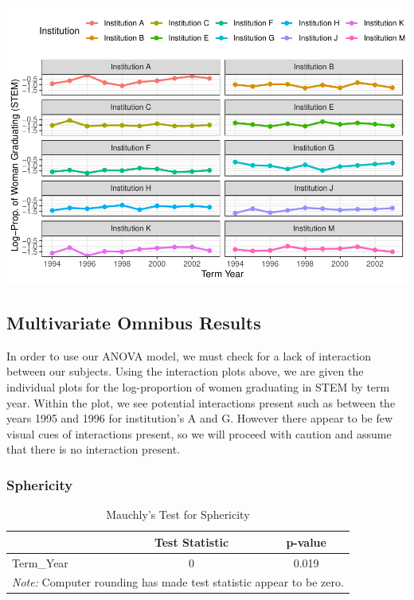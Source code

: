\documentclass[]{article}
\begin{document}
\includegraphics{Stat_461_Final_Project_Report_files/figure-latex/logInteraction-1.pdf}

\subsection{Multivariate Omnibus
Results}\label{multivariate-omnibus-results}

In order to use our ANOVA model, we must check for a lack of interaction
between our subjects. Using the interaction plots above, we are given
the individual plots for the log-proportion of women graduating in STEM
by term year. Within the plot, we see potential interactions present
such as between the years 1995 and 1996 for institution's A and G.
However there appear to be few visual cues of interactions present, so
we will proceed with caution and assume that there is no interaction
present.

\subsubsection{Sphericity}\label{sphericity}

\begin{table}[H]

\caption{\label{tab:Sphericity}Mauchly's Test for Sphericity}
\centering
\fontsize{12}{14}\selectfont
\begin{tabular}[t]{l|c|c}
\hline
  & Test Statistic & p-value\\
\hline
Term\_Year & 0 & 0.019\\
\hline
\multicolumn{3}{l}{\textit{Note: } Computer rounding has made test statistic appear to be zero.}\\
\end{tabular}
\end{table}
\end{document}

